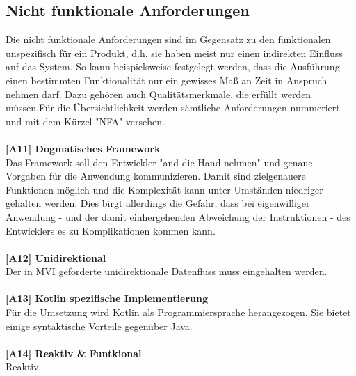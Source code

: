 \subsection{Nicht funktionale Anforderungen}
Die nicht funktionale Anforderungen sind im Gegensatz zu den funktionalen unspezifisch für ein Produkt, d.h. sie haben meist nur einen indirekten Einfluss auf das System. So kann beispielsweise festgelegt werden, dass die Ausführung einen bestimmten Funktionalität nur ein gewisses Maß an Zeit in Anspruch nehmen darf. Dazu gehören auch Qualitätsmerkmale, die erfüllt werden müssen.Für die Übersichtlichkeit werden sämtliche Anforderungen nummeriert und mit dem Kürzel "NFA" versehen.
\\
\\
\textbf{[A11] Dogmatisches Framework}
\\
Das Framework soll den Entwickler "and die Hand nehmen" und genaue Vorgaben für die Anwendung kommunizieren. Damit sind zielgenauere Funktionen möglich und die Komplexität kann unter Umständen niedriger gehalten werden. Dies birgt allerdings die Gefahr, dass bei eigenwilliger Anwendung - und der damit einhergehenden Abweichung der Instruktionen - des Entwicklers es zu Komplikationen kommen kann.
\\
\\
\textbf{[A12] Unidirektional}
\\
Der in MVI geforderte unidirektionale Datenfluss muss eingehalten werden.
\\
\\
\textbf{[A13] Kotlin spezifische Implementierung}
\\
Für die Umsetzung wird Kotlin als Programmiersprache herangezogen. Sie bietet einige syntaktische Vorteile gegenüber Java.
\\
\\
\textbf{[A14] Reaktiv \& Funtkional}
\\
Reaktiv
